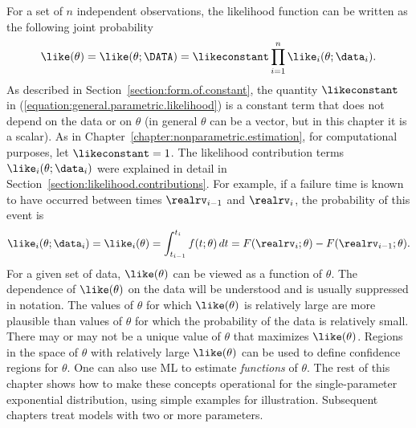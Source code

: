 For a set of $n$ independent observations, the likelihood function
can be written as the following joint probability
\begin{equation}
\label{equation:general.parametric.likelihood}
\like(\theta)=\like(\theta;\DATA)= \likeconstant \prod_{i=1}^{n}
\like_{i}(\theta;\data_{i}).
\end{equation}
As described in Section~\ref{section:form.of.constant}, the quantity
$\likeconstant$ in (\ref{equation:general.parametric.likelihood}) is a
constant term that does not depend on the data or on $\theta$
(in general $\theta$ can be a vector, but in this chapter it is a 
scalar).  As
in Chapter~\ref{chapter:nonparametric.estimation}, for computational
purposes, let $\likeconstant=1$.  The likelihood contribution terms
$\like_{i}(\theta;\data_{i})$ were explained in detail in
Section~\ref{section:likelihood.contributions}. For example, if a
failure time is known to have occurred between times $\realrv_{i-1}$
and $\realrv_{i}$, the probability of this event is
\begin{equation}
\label{equation:parametric.interval.likelihood}
\like_{i}(\theta;\data_{i})=\like_{i}(\theta)=
\int_{t_{i-1}}^{t_{i}} f(t;\theta) \, dt = 
F(\realrv_{i};
\theta)-F(\realrv_{i-1};\theta).
\end{equation}
For a given set of data, $\like(\theta)$ can be viewed as a function
of $\theta$.  The dependence of $\like(\theta)$ on the data will
be understood and is usually suppressed in notation.  The values
of $\theta$ for which $\like(\theta)$ is relatively large are
more plausible than values of $\theta$ for which the probability of
the data is relatively small.  There may or may not be a unique value
of $\theta$ that maximizes $\like(\theta)$.  Regions in the
space of $\theta$ with relatively large $\like(\theta)$ can be
used to define confidence regions for $\theta$.  One can also use ML
to estimate {\em functions} of $\theta$.
The rest of this chapter shows how to make these concepts
operational for the single-parameter exponential distribution,
using simple examples for illustration. Subsequent chapters treat
models with two or more parameters.


